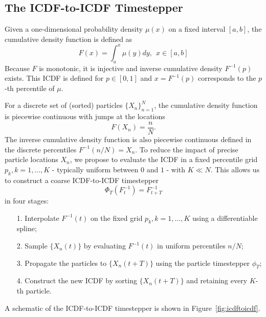 \documentclass{article}
\begin{document}
\subsection{The ICDF-to-ICDF Timestepper}
Given a one-dimensional probability density $\mu(x)$ on a fixed interval $[a,b]$, the cumulative density function is defined as
\begin{equation} \label{eq:1d_cdf}
 F(x) = \int_{a}^x \mu(y)dy, \ \ x \in [a,b]
\end{equation}
Because $F$ is monotonic, it is injective and inverse cumulative density $F^{-1}(p)$ exists. This ICDF is defined for $p \in [0,1]$ and $x = F^{-1}(p)$ corresponds to the $p$-th percentile of $\mu$.

For a discrete set of (sorted) particles $\{X_n\}_{n=1}^N$, the cumulative density function is piecewise continuous with jumps at the locations
\begin{equation}
 F(X_n) = \frac{n}{N}.
\end{equation}
The inverse cumulative density function is also piecewise continuous defined in the discrete percentiles $F^{-1}\left(n/N\right) = X_n$. To reduce the impact of precise particle locations $X_n$, we propose to evaluate the ICDF in a fixed percentile grid $p_k, k=1,\dots,K$ - typically uniform between $0$ and $1$ - with $K \ll N$. This allows us to construct a coarse ICDF-to-ICDF timestepper
\begin{equation}
    \Phi_T\left(F^{-1}_t\right) = F^{-1}_{t+T}
\end{equation}
in four stages:
\begin{itemize}
    \item[1.] Interpolate $F^{-1}(t)$ on the fixed grid $p_k, k=1,\dots,K$ using a differentiable spline;
    \item[2.] Sample $\{X_n(t)\}$ by evaluating $F^{-1}(t)$ in uniform percentiles $n/N$;
    \item[3.] Propagate the particles to $\{X_n(t+T)\}$ using the particle timestepper $\phi_T$;
    \item[4.] Construct the new ICDF by sorting $\{X_n(t+T)\}$ and retaining every $K$-th particle.
\end{itemize}
A schematic of the ICDF-to-ICDF timestepper is shown in Figure~\ref{fig:icdftoicdf}.
\end{document}
